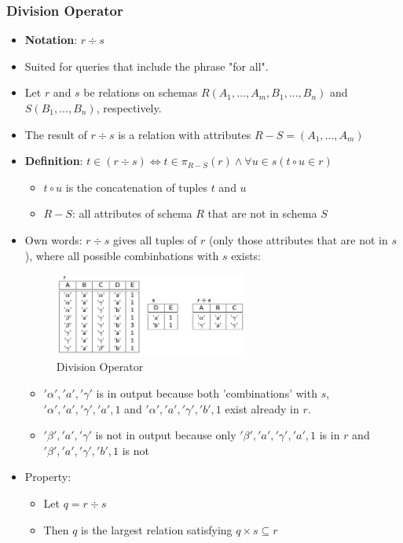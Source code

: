 \subsubsection{Division Operator}
\begin{itemize}[label=\(\rhd\)]
    \item \textbf{Notation}: $r \div s$
    \item Suited for queries that include the phrase "for all".
    \item Let $r$ and $s$ be relations on schemas $R(A_1,...,A_m,B_1,...,B_n)$ and $S(B_1,...,B_n)$, respectively.
    \item The result of $r \div s$ is a relation with attributes $R-S=(A_1,...,A_m)$
    \item \textbf{Definition}: $t\in (r \div s) \Leftrightarrow t \in \pi_{R-S}(r) \land \forall u \in s(t\circ u \in r)$
    \begin{itemize}[label=\(\rhd\)]
        \item $t \circ u$ is the concatenation of tuples $t$ and $u$
        \item $R-S$: all attributes of schema $R$ that are not in schema $S$
    \end{itemize}
    \item Own words: $r\div s$ gives all tuples of $r$ (only those attributes that are not in $s$), where all possible combinbations with $s$ exists: 

\begin{figure}[H]
\centering
\includegraphics[width=0.6\textwidth]{images/Screenshot 2024-05-04 at 09.59.38.jpg}
\caption{Division Operator}
\end{figure}
    \begin{itemize}[label=\(\rhd\)]
        \item $'\alpha','a','\gamma'$ is in output because both 'combinations' with $s$, $'\alpha','a','\gamma','a',1$ and $'\alpha','a','\gamma','b',1$ exist already in $r$.
        \item $'\beta','a','\gamma'$ is not in output because only $'\beta','a','\gamma','a',1$ is in $r$ and $'\beta','a','\gamma','b',1$ is not
    \end{itemize}
    \item Property: 
    \begin{itemize}[label=\(\rhd\)]
        \item Let $q=r\div s$
        \item Then $q$ is the largest relation satisfying $q\times s \subseteq r$
    \end{itemize}
\end{itemize}

